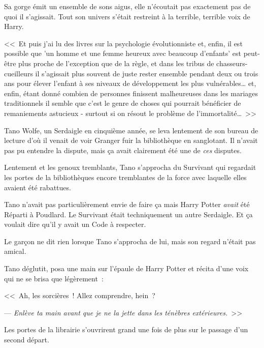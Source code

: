 Sa gorge émit un ensemble de sons aigus, elle n'écoutait pas exactement pas de quoi il s'agissait. Tout son univers s'était restreint à la terrible, terrible voix de Harry.

<<~Et puis j'ai lu des livres sur la psychologie évolutionniste et, enfin, il est possible que 'un homme et une femme heureux avec beaucoup d'enfants' est peut-être plus proche de l'exception que de la règle, et dans les tribus de chasseurs-cueilleurs il s'agissait plus souvent de juste rester ensemble pendant deux ou trois ans pour élever l'enfant à ses niveaux de développement les plus vulnérables… et, enfin, étant donné combien de personnes finissent malheureuses dans les mariages traditionnels il semble que c'est le genre de choses qui pourrait bénéficier de remaniements astucieux - surtout si on résout le problème de l'immortalité…~>>

\later

Tano Wolfe, un Serdaigle en cinquième année, se leva lentement de son bureau de lecture d'où il venait de voir Granger fuir la bibliothèque en sanglotant. Il n'avait pas pu entendre la dispute, mais ça avait clairement été une de \emph{ces} disputes.

Lentement et les genoux tremblants, Tano s'approcha du Survivant qui regardait les portes de la bibliothèques encore tremblantes de la force avec laquelle elles avaient été rabattues.

Tano n'avait pas particulièrement envie de faire ça mais Harry Potter \emph{avait} été Réparti à Poudlard. Le Survivant était techniquement un autre Serdaigle. Et ça voulait dire qu'il y avait un Code à respecter.

Le garçon ne dit rien lorsque Tano s'approcha de lui, mais son regard n'était pas amical.

Tano déglutit, posa une main sur l'épaule de Harry Potter et récita d'une voix qui ne se brisa que légèrement~:

<<~Ah, les sorcières~! Allez comprendre, hein~?

--- \emph{Enlève ta main avant que je ne la jette dans les ténèbres extérieures.}~>>

Les portes de la librairie s'ouvrirent grand une fois de plus sur le passage d'un second départ.
